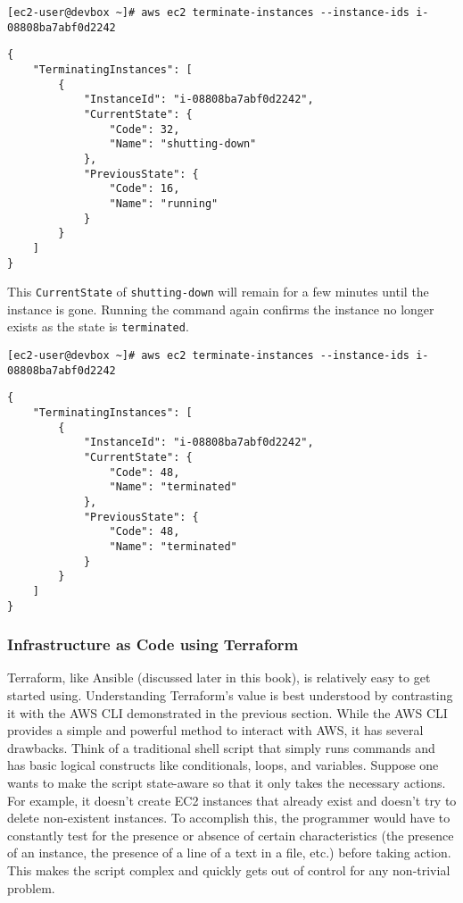 \begin{verbatim}
[ec2-user@devbox ~]# aws ec2 terminate-instances --instance-ids i-08808ba7abf0d2242
\end{verbatim}

\begin{verbatim}
{
    "TerminatingInstances": [
        {
            "InstanceId": "i-08808ba7abf0d2242", 
            "CurrentState": {
                "Code": 32, 
                "Name": "shutting-down"
            }, 
            "PreviousState": {
                "Code": 16, 
                "Name": "running"
            }
        }
    ]
}
\end{verbatim}

This \verb|CurrentState| of \verb|shutting-down| will remain for a few minutes
until the instance is gone. Running the command again confirms the instance no
longer exists as the state is \verb|terminated|.

\begin{verbatim}
[ec2-user@devbox ~]# aws ec2 terminate-instances --instance-ids i-08808ba7abf0d2242
\end{verbatim}

\begin{verbatim}
{
    "TerminatingInstances": [
        {
            "InstanceId": "i-08808ba7abf0d2242", 
            "CurrentState": {
                "Code": 48, 
                "Name": "terminated"
            }, 
            "PreviousState": {
                "Code": 48, 
                "Name": "terminated"
            }
        }
    ]
}
\end{verbatim}

\subsubsection{Infrastructure as Code using Terraform}
Terraform, like Ansible (discussed later in this book), is relatively easy to
get started using. Understanding Terraform's value is best understood by
contrasting it with the AWS CLI demonstrated in the previous section. While
the AWS CLI provides a simple and powerful method to interact with AWS, it has
several drawbacks. Think of a traditional shell script that simply runs
commands and has basic logical constructs like conditionals, loops, and
variables. Suppose one wants to make the script state-aware so that it only
takes the necessary actions. For example, it doesn't create EC2 instances that
already exist and doesn't try to delete non-existent instances. To accomplish
this, the programmer would have to constantly test for the presence or absence
of certain characteristics (the presence of an instance, the presence of a
line of a text in a file, etc.) before taking action. This makes the script
complex and quickly gets out of control for any non-trivial problem.

